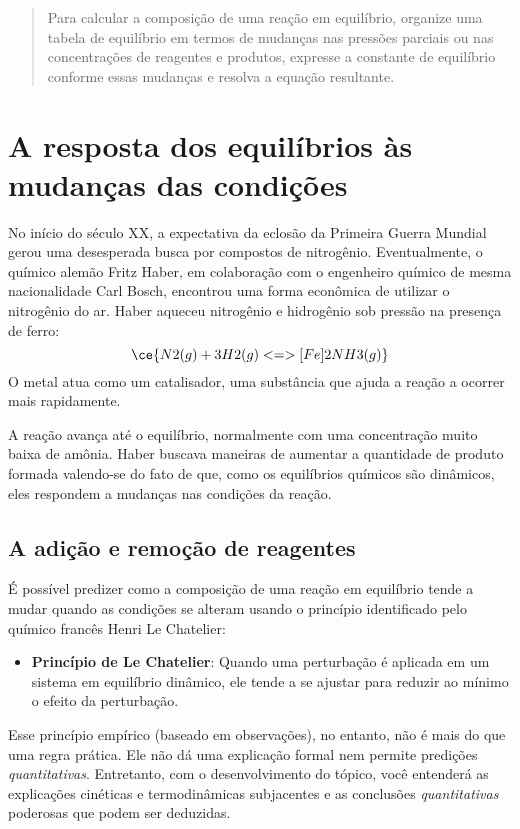 \begin{quote}
Para calcular a composição de uma reação em equilíbrio, organize uma tabela de equilíbrio em termos de mudanças nas pressões parciais ou nas
concentrações de reagentes e produtos, expresse a constante de equilíbrio conforme essas mudanças e resolva a equação resultante.
\end{quote}

\section{A resposta dos equilíbrios às mudanças das condições}

No início do século XX, a expectativa da eclosão da Primeira Guerra Mundial gerou uma desesperada busca por compostos de nitrogênio. Eventualmente, o
químico alemão Fritz Haber, em colaboração com o engenheiro químico de mesma nacionalidade Carl Bosch, encontrou uma forma econômica de utilizar o
nitrogênio do ar. Haber aqueceu nitrogênio e hidrogênio sob pressão na presença de ferro: \[
    \ce{ N2(g) + 3 H2(g) <=>[Fe] 2 NH3(g) }
\] O metal atua como um catalisador, uma substância que ajuda a reação a ocorrer mais rapidamente.

A reação avança até o equilíbrio, normalmente com uma concentração muito baixa de amônia. Haber buscava maneiras de aumentar a quantidade de produto
formada valendo-se do fato de que, como os equilíbrios químicos são dinâmicos, eles respondem a mudanças nas condições da reação.

\subsection{A adição e remoção de reagentes}

É possível predizer como a composição de uma reação em equilíbrio tende a mudar quando as condições se alteram usando o princípio identificado pelo
químico francês Henri Le Chatelier:

\begin{itemize}
\tightlist
\item
  \textbf{Princípio de Le Chatelier}: Quando uma perturbação é aplicada em um sistema em equilíbrio dinâmico, ele tende a se ajustar para reduzir ao
  mínimo o efeito da perturbação.
\end{itemize}

Esse princípio empírico (baseado em observações), no entanto, não é mais do que uma regra prática. Ele não dá uma explicação formal nem permite
predições \emph{quantitativas}. Entretanto, com o desenvolvimento do tópico, você entenderá as explicações cinéticas e termodinâmicas subjacentes e as
conclusões \emph{quantitativas} poderosas que podem ser deduzidas.


